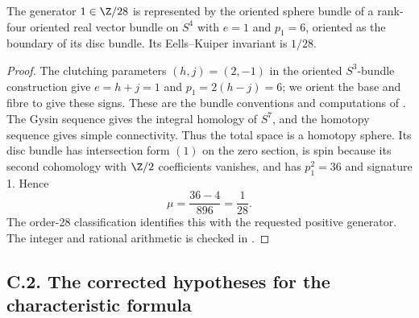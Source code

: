 \begin{proposition}
The generator $1\in\Z/28$ is represented by the oriented sphere
bundle of a rank-four oriented real vector bundle on $S^4$ with
$e=1$ and $p_1=6$, oriented as the boundary of its disc bundle.
Its Eells--Kuiper invariant is $1/28$.
\end{proposition}
\begin{proof}
The clutching parameters $(h,j)=(2,-1)$ in the oriented
$S^3$-bundle construction give $e=h+j=1$ and $p_1=2(h-j)=6$;
we orient the base and fibre to give these signs. These are the
bundle conventions and computations of \citet[Section 6,
equations (12)--(13)]{EellsKuiper1962}. The Gysin sequence gives
the integral homology of $S^7$, and the homotopy sequence gives
simple connectivity. Thus the total space is a homotopy sphere.
Its disc bundle has intersection form $(1)$ on the zero section,
is spin because its second cohomology with $\Z/2$ coefficients
vanishes, and has $p_1^2=36$ and signature 1. Hence
\[
 \mu=\frac{36-4}{896}=\frac1{28}.
\]
The order-28 classification identifies this with the requested
positive generator. The integer and rational arithmetic is checked
in .
\end{proof}

\subsection{C.2. The corrected hypotheses for the characteristic formula}

